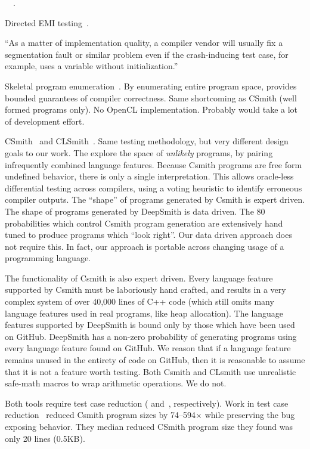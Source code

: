 ~\cite{Godefroid2008a,Le2015,Sun2016a}~\cite{Kossatchev2005}.

 Directed EMI testing~\cite{Le2015}.


``As a matter of implementation quality, a compiler vendor will usually fix a segmentation fault or similar problem even if the crash-inducing test case, for example, uses a variable without initialization.''~\cite{Regehr2012a}

Skeletal program enumeration~\cite{Zhang2016a}. By enumerating entire program space, provides bounded guarantees of compiler correctness. Same shortcoming as CSmith (well formed programs only). No OpenCL implementation. Probably would take a lot of development effort. 

CSmith~\cite{Yang2011} and CLSmith~\cite{Lidbury2015a}. Same testing methodology, but very different design goals to our work. The explore the space of \emph{unlikely} programs, by pairing infrequently combined language features. Because Csmith programs are free form undefined behavior, there is only a single interpretation. This allows oracle-less differential testing across compilers, using a voting heuristic to identify erroneous compiler outputs. The ``shape'' of programs generated by Csmith is expert driven. The shape of programs generated by DeepSmith is data driven. The 80 probabilities which control Csmith program generation are extensively hand tuned to produce programs which ``look right''. Our data driven approach does not require this. In fact, our approach is portable across changing usage of a programming language.

The functionality of Csmith is also expert driven. Every language feature supported by Csmith must be laboriously hand crafted, and results in a very complex system of over 40,000 lines of C++ code (which still omits many language features used in real programs, like heap allocation). The language features supported by DeepSmith is bound only by those which have been used on GitHub. DeepSmith has a non-zero probability of generating programs using every language feature found on GitHub. We reason that if a language feature remains unused in the entirety of code on GitHub, then it is reasonable to assume that it is not a feature worth testing. Both Csmith and CLsmith use unrealistic safe-math macros to wrap arithmetic operations. We do not.

Both tools require test case reduction (\cite{Regehr2012a} and~\cite{Pflanzer2016}, respectively). Work in test case reduction~\cite{Regehr2012a} reduced Csmith program sizes by 74--594$\times$ while preserving the bug exposing behavior. They median reduced CSmith program size they found was only 20 lines (0.5KB).

